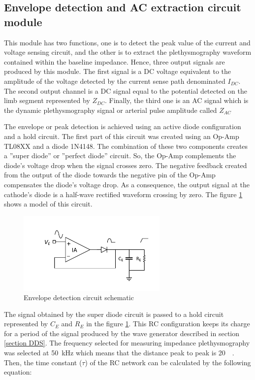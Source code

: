 \subsection{Envelope detection and AC extraction circuit module}
\label{section material envelope}
This module has two functions, one is to detect the peak value of the current and voltage sensing circuit, and the other is to extract the plethysmography waveform contained within the baseline impedance. Hence, three output signals are produced by this module. The first signal is a DC voltage equivalent to the amplitude of the voltage detected by the current sense path denominated $I_{DC}$. The second output channel is a DC signal equal to the potential detected on the limb segment represented by $Z_{DC}$. Finally, the third one is an AC signal which is the dynamic plethysmography signal or arterial pulse amplitude called $Z_{AC}$

The envelope or peak detection is achieved using an active diode configuration and a hold circuit. The first part of this circuit was created using an Op-Amp TL08XX \cite{ti:TL08xx} and a diode 1N4148. The combination of these two components creates a ''super diode'' or ''perfect diode'' circuit. So, the Op-Amp complements the diode's voltage drop when the signal crosses zero. The negative feedback created from the output of the diode towards the negative pin of the Op-Amp compensates the diode's voltage drop. As a consequence, the output signal at the cathode's diode is a half-wave rectified waveform crossing by zero. The figure \ref{fig:envelope} shows a model of this circuit. 

\begin{figure}[!htpb]
	\centering
	\includegraphics[width=7.3cm,keepaspectratio]{figure5}
 	\caption{Envelope detection circuit schematic}
    \label{fig:envelope}
\end{figure}

The signal obtained by the super diode circuit is passed to a hold circuit represented by $C_E$ and $R_E$ in the figure \ref{fig:envelope}. This RC configuration keeps its charge for a period of the signal produced by the wave generator described in section \ref{section DDS}. The frequency selected for measuring impedance plethysmography was selected at \SI{50}{\kHz} which means that the distance peak to peak is \SI{20}{\micro\sec}. Then, the time constant ($\tau$) of the RC network can be calculated by the following equation:

